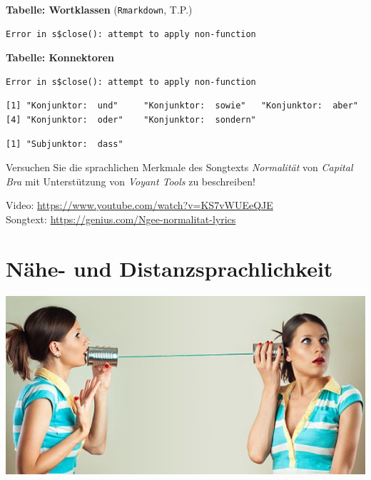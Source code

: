 \documentclass[
  letterpaper,
  DIV=11,
  numbers=noendperiod]{scrreprt}
\begin{document}
\textbf{Tabelle: Wortklassen} (\texttt{Rmarkdown}, T.P.)

\begin{verbatim}
Error in s$close(): attempt to apply non-function
\end{verbatim}

\textbf{Tabelle: Konnektoren}

\begin{verbatim}
Error in s$close(): attempt to apply non-function
\end{verbatim}

\begin{verbatim}
[1] "Konjunktor:  und"     "Konjunktor:  sowie"   "Konjunktor:  aber"   
[4] "Konjunktor:  oder"    "Konjunktor:  sondern"
\end{verbatim}

\begin{verbatim}
[1] "Subjunktor:  dass"
\end{verbatim}

Versuchen Sie die sprachlichen Merkmale des Songtexts \emph{Normalität}
von \emph{Capital Bra} mit Unterstützung von \emph{Voyant Tools} zu
beschreiben!

Video: \url{https://www.youtube.com/watch?v=KS7vWUEeQJE}\\
Songtext: \url{https://genius.com/Ngee-normalitat-lyrics}


\hypertarget{nuxe4he--und-distanzsprachlichkeit}{%
\chapter{Nähe- und
Distanzsprachlichkeit}\label{nuxe4he--und-distanzsprachlichkeit}}

\includegraphics[width=1\textwidth,height=\textheight]{./pictures/nahe_distanz_schnurtelefon.jpg}
\end{document}
